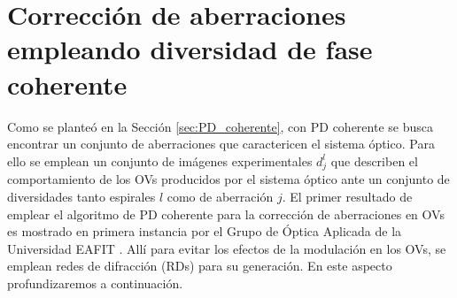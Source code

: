 


\section{Corrección de aberraciones empleando diversidad de fase coherente}
\label{sec:cor_div_coh}


Como se planteó en la Sección \ref{sec:PD_coherente}, con PD coherente se busca encontrar un conjunto de aberraciones que caractericen el sistema óptico. Para ello se emplean un conjunto de imágenes experimentales $d_j^l$ que describen el comportamiento de los OVs producidos por el sistema óptico ante un conjunto de diversidades tanto espirales $l$ como de aberración $j$. El primer resultado de emplear el algoritmo de PD coherente para la corrección de aberraciones en OVs es mostrado en primera instancia por el Grupo de Óptica Aplicada de la Universidad EAFIT \cite{EcheverriChacon2015}. Allí para evitar los efectos de la modulación en los OVs, se emplean redes de difracción (RDs) para su generación. En este aspecto profundizaremos a continuación. \\

